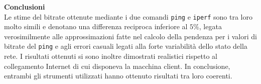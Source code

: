 \documentclass[a4paper,10pt]{article}
\begin{document}
\noindent
\textbf{Conclusioni}\\
Le stime del bitrate ottenute mediante i due comandi \texttt{ping} e \texttt{iperf} sono tra loro molto simili e denotano una differenza reciproca inferiore al $5\%$, legata verosimilmente alle approssimazioni fatte nel calcolo della pendenza per i valori di bitrate del \texttt{ping} e agli errori casuali legati alla forte variabilità dello stato della rete. I risultati ottenuti si sono inoltre dimostrati realistici rispetto al collegamento Internet di cui disponeva la macchina client. In conclusione, entrambi gli strumenti utilizzati hanno ottenuto risultati tra loro coerenti.
\end{document}
